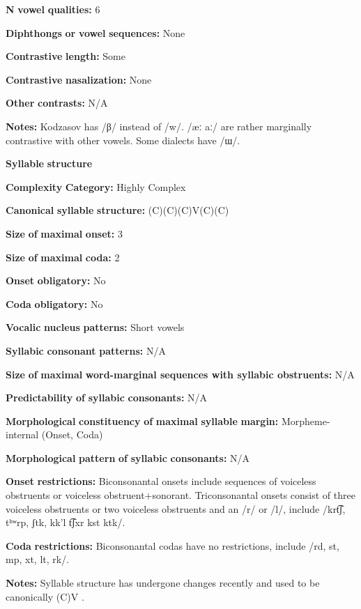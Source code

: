 \begin{styleBody}
\textbf{N} \textbf{vowel} \textbf{qualities:} 6

\textbf{Diphthongs} \textbf{or} \textbf{vowel} \textbf{sequences:} None

\textbf{Contrastive} \textbf{length:} Some

\textbf{Contrastive} \textbf{nasalization:} None

\textbf{Other} \textbf{contrasts:} N/A

\textbf{Notes:} Kodzasov has /β/ instead of /w/. /æː aː/ are rather marginally contrastive with other vowels. Some dialects have /ɯ/.

\textbf{Syllable} \textbf{structure}

\textbf{Complexity} \textbf{Category:} Highly Complex

\textbf{Canonical} \textbf{syllable} \textbf{structure:} (C)(C)(C)V(C)(C) \citep[40-46]{Haspelmath1993}

\textbf{Size} \textbf{of} \textbf{maximal} \textbf{onset:} 3

\textbf{Size} \textbf{of} \textbf{maximal} \textbf{coda:} 2

\textbf{Onset} \textbf{obligatory:} No

\textbf{Coda} \textbf{obligatory:} No

\textbf{Vocalic} \textbf{nucleus} \textbf{patterns:} Short vowels

\textbf{Syllabic} \textbf{consonant} \textbf{patterns:} N/A

\textbf{Size} \textbf{of} \textbf{maximal} \textbf{word{}-marginal sequences with syllabic obstruents:} N/A

\textbf{Predictability} \textbf{of} \textbf{syllabic} \textbf{consonants:} N/A

\textbf{Morphological} \textbf{constituency} \textbf{of} \textbf{maximal} \textbf{syllable} \textbf{margin:} Morpheme-internal (Onset, Coda)

\textbf{Morphological} \textbf{pattern} \textbf{of} \textbf{syllabic} \textbf{consonants:} N/A

\textbf{Onset} \textbf{restrictions:} Biconsonantal onsets include sequences of voiceless obstruents or voiceless obstruent+sonorant. Triconsonantal onsets consist of three voiceless obstruents or two voiceless obstruents and an /r/ or /l/, include /krt͡ʃ, tʰʷrp, ʃtk, kk'l t͡ʃxr kst ktk/.

\textbf{Coda} \textbf{restrictions:} Biconsonantal codas have no restrictions, include /rd, st, mp, xt, lt, rk/.

\textbf{Notes:} Syllable structure has undergone changes recently and used to be canonically (C)V \citep[46]{Haspelmath1993}.


\end{styleBody}
